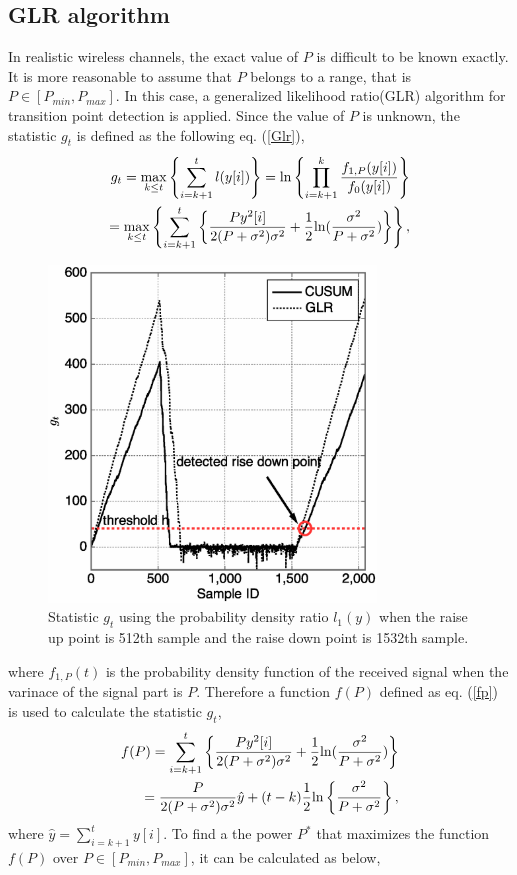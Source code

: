 \subsection{GLR algorithm}
In realistic wireless channels, the exact value of $P$ is difficult to be known exactly. It is more reasonable to assume that $P$ belongs to a range, that is $P \in [P_{min}, P_{max}]$. In this case, a generalized likelihood ratio(GLR) algorithm\cite{GLR} for transition point detection is applied. Since the value of $P$ is unknown, the statistic $g_t$ is defined as the following eq. (\ref{Glr}),
\begin{eqnarray}
g_t = \max_{k \leq t}\left\{ \sum_{i=k+1}^tl(y[i])\right\}={\rm ln}\left\{\prod_{i=k+1}^k\frac{f_{1,P}(y[i])}{f_0(y[i])}\right\} \nonumber \\ 
   = \max_{k \leq t}\left\{\sum_{i=k+1}^t\left\{ \frac{Py^2[i]}{2(P+\sigma^2)\sigma^2}+\frac{1}{2} {\rm ln}(\frac{\sigma^2}{P+\sigma^2}) \right\}\right\},
\label{Glr}
\end{eqnarray}
\begin{figure}[t]
\centering
\includegraphics[width=87mm]{ON2OFF.eps}
\caption{Statistic $g_t$ using the probability density ratio $l_1(y)$ when the raise up point is 512th sample and the raise down point is 1532th sample.}
\label{ON2OFF}
\end{figure}
where $f_{1,P}(t)$ is the probability density function of the received signal when the varinace of the signal part is $P$. Therefore a function $f(P)$ defined as eq. (\ref{fp}) is used to calculate the statistic $g_t$,
\begin{eqnarray}
f(P) = \sum_{i=k+1}^t\left\{ \frac{Py^2[i]}{2(P+\sigma^2)\sigma^2}+\frac{1}{2} {\rm ln}(\frac{\sigma^2}{P+\sigma^2})\right\} \nonumber\\ 
=\frac{P}{2(P+\sigma^2)\sigma^2}\hat{y}+(t-k)\frac{1}{2}{\rm ln}\left\{ \frac{\sigma^2}{P+\sigma^2} \right\},
\label{fp}
\end{eqnarray}
where $\hat{y}=\sum_{i=k+1}^t y[i]$. To find a the power $P^{*}$ that maximizes the function $f(P)$ over $P \in [P_{min}, P_{max}]$, it can be calculated as below,

